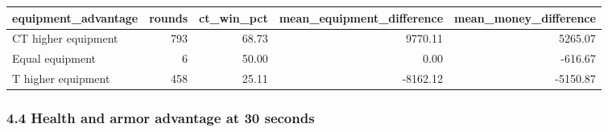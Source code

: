 \documentclass[
  letterpaper,
  DIV=11,
  numbers=noendperiod]{scrartcl}
\newcounter{none} %
\begin{document}
{\def\LTcaptype{none} %
\begin{longtable}[]{@{}lrrrr@{}}
\toprule\noalign{}
equipment\_advantage & rounds & ct\_win\_pct &
mean\_equipment\_difference & mean\_money\_difference \\
\midrule\noalign{}
\endhead
\bottomrule\noalign{}
\endlastfoot
CT higher equipment & 793 & 68.73 & 9770.11 & 5265.07 \\
Equal equipment & 6 & 50.00 & 0.00 & -616.67 \\
T higher equipment & 458 & 25.11 & -8162.12 & -5150.87 \\
\end{longtable}
}

\subsubsection{4.4 Health and armor advantage at 30
seconds}\label{health-and-armor-advantage-at-30-seconds}
\end{document}

